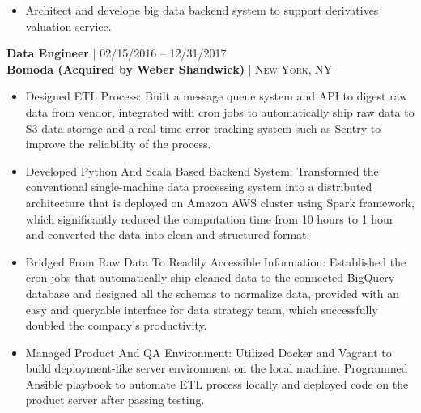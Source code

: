 \documentclass[10pt]{article} %
\begin{document}
{\begin{minipage}[t]{0.5\textwidth}
\begin{itemize}[leftmargin=*, topsep=2pt, partopsep=2.5pt]
\setlength\itemsep{1pt}

\item Architect and develope big data backend system to support derivatives valuation service. 


\end{itemize}




{\raggedright\normalsize
\textbf{Data Engineer} {\hfill\footnotesize\textsc{| 02/15/2016 -- 12/31/2017}}\\ 
\textbf{Bomoda (Acquired by Weber Shandwick)} {\hfill\footnotesize\textsc{| New York, NY}}}

\begin{itemize}[leftmargin=*, topsep=2pt, partopsep=2.5pt]
\setlength\itemsep{1pt}

\item Designed ETL Process: Built a message queue system and API to digest raw data from vendor, integrated with cron jobs to automatically ship raw data to S3 data storage and a real-time error tracking system such as Sentry to improve the reliability of the process.

\item Developed Python And Scala Based Backend System: Transformed the conventional single-machine data processing system into a distributed architecture that is deployed on Amazon AWS cluster using Spark framework, which significantly reduced the computation time from 10 hours to 1 hour and converted the data into clean and structured format.

\item Bridged From Raw Data To Readily Accessible Information: Established the cron jobs that automatically ship cleaned data to the connected BigQuery database and designed all the schemas to normalize data, provided with an easy and queryable interface for data strategy team, which successfully doubled the company's productivity.

\item Managed Product And QA Environment: Utilized Docker and Vagrant to build deployment-like server environment on the local machine. Programmed Ansible playbook to automate ETL process locally and deployed code on the product server after passing testing.



\end{itemize}
\end{minipage}}
\end{document}
